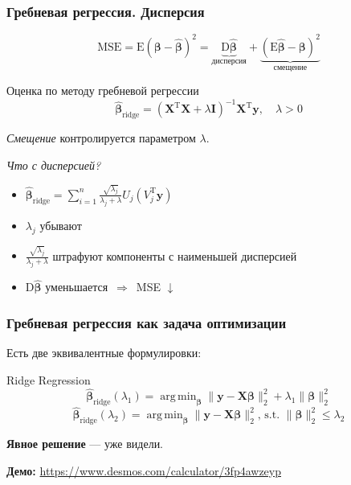 \documentclass[ucs, notheorems, handout]{beamer}
\DeclareMathOperator*{\argmin}{arg\,min}
\newcommand{\betah}{\hat{\bm \beta}}
\newcommand{\betaa}{\bm{\beta}}
\newcommand{\E}{\mathrm{E}}
\newcommand{\D}{\mathrm{D}}
\newcommand{\XT}{{\bm{X}}^{\mathrm{T}}}
\newcommand{\X}{\bm{X}}
\begin{document}
\begin{frame}
    \frametitle{Гребневая регрессия. Дисперсия}
$$\mathrm{MSE} = \E(\betaa - \betah)^2 = \underbrace{\mathrm D \betah}_{\text{дисперсия}} + \underbrace{(\mathrm E \betah - \betaa)^2}_{\text{смещение}}$$

\begin{block}{Оценка по методу гребневой регрессии}
$$\betah_{\text{ridge}} = (\XT \X + \lambda \mathbf I)^{-1}\XT\bm y,\quad \lambda > 0$$
\end{block}	

\textit{Смещение} контролируется параметром $\lambda$.
	
	\textit{Что с дисперсией?}
	
	\begin{itemize}
		\item $\betah_{\text{ridge}} = \sum_{i = 1}^n \frac{\sqrt{\lambda_j}}{\lambda_j + \lambda} U_j(V_j^\mathrm T\bm y)$
		\item $\lambda_j$ убывают
		\item $\frac{\sqrt{\lambda_j}}{\lambda_j + \lambda}$ штрафуют компоненты с наименьшей дисперсией
		\item  $\D \betah$ уменьшается $\, \Rightarrow \,$  MSE $\downarrow$
	\end{itemize}
	

    \note{
	
    }
\end{frame}

\begin{frame}
    \frametitle{Гребневая регрессия как задача оптимизации}
Есть две эквивалентные формулировки:
\begin{block}{Ridge Regression}
$$\betah_{\text{ridge}}(\lambda_1) = \argmin_{\betaa}{\|\bm y - \X\betaa\|^2_2 +\lambda_1 \|\betaa\|^2_2}
$$
$$
\betah_{\text{ridge}}(\lambda_2) = \argmin_{\betaa}{\|\bm y - \X\betaa\|^2_2 \text{, s.t. } \|\betaa\|^2_2 \leqslant \lambda_2}
$$
\end{block}	

\textbf{Явное решение} --- уже видели.

\textbf{Демо:} \url{https://www.desmos.com/calculator/3fp4awzeyp}

    \note{
	
    }
\end{frame}
\end{document}
